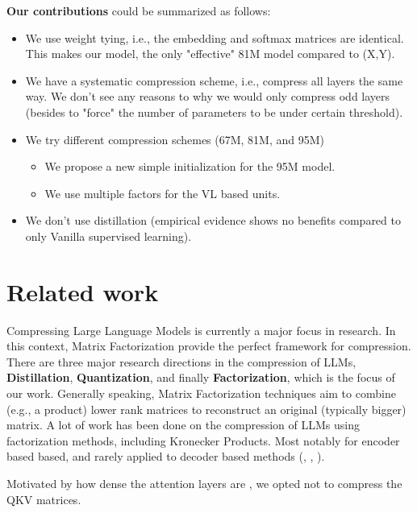 \documentclass{article}
\begin{document}
\textbf{Our contributions} could be summarized as follows:
\begin{itemize}
    \item We use weight tying, i.e., the embedding and softmax matrices are identical. This makes our model, the only "effective" 81M model compared to (X,Y).
    \item We have a systematic compression scheme, i.e., compress all layers the same way. We don't see any reasons to why we would only compress odd layers (besides to "force" the number of parameters to be under certain threshold).
    \item We try different compression schemes (67M, 81M, and 95M)
		\begin{itemize}
			\item We propose a new simple initialization for the 95M model.
			\item We use multiple factors for the VL based units.
		\end{itemize}
    \item We don't use distillation (empirical evidence shows no benefits compared to only Vanilla supervised learning).
\end{itemize}

\section{Related work}%
\label{sec:Related work}

Compressing Large Language Models is currently a major focus in research. In this context, Matrix Factorization provide the perfect framework for compression. There are three major research directions in the compression of LLMs, \textbf{Distillation}, \textbf{Quantization}, and finally \textbf{Factorization}, which is the focus of our work. Generally speaking, Matrix Factorization techniques aim to combine (e.g., a product) lower rank matrices to reconstruct an original (typically bigger) matrix. A lot of work has been done on the compression of LLMs using factorization methods, including Kronecker Products. Most notably for encoder based based, and rarely applied to decoder based methods (\cite{tahaei2022kroneckerbert}, \cite{edalati2021kroneckr}, \cite{abronin2024tqcompressor}).



Motivated by how dense the attention layers are \cite{}, we opted not to compress the QKV matrices.  
\end{document}
